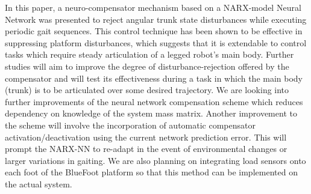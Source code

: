 
In this paper, a neuro-compensator mechanism based on a NARX-model Neural Network was presented to reject angular trunk state disturbances while executing periodic gait sequences. This control technique has been shown to be effective in suppressing platform disturbances, which suggests that it is extendable to control tasks which require steady articulation of a legged robot's main body. Further studies will aim to improve the degree of disturbance-rejection offered by the compensator and will test its effectiveness during a task in which the main body (trunk) is to be articulated over some desired trajectory. We are looking into further improvements of the neural network compensation scheme which reduces dependency on knowledge of the system mass matrix. Another improvement to the scheme will involve the incorporation of automatic compensator activation/deactivation using the current network prediction error. This will prompt the  NARX-NN to re-adapt in the event of environmental changes or larger variations in gaiting. We are also planning on integrating load sensors onto each foot of the BlueFoot platform so that this method can be implemented on the actual system.